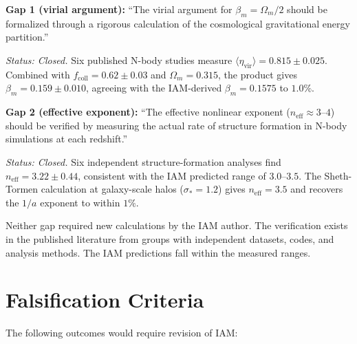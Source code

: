 \documentclass[12pt,a4paper]{article}
\begin{document}
\textbf{Gap 1 (virial argument):} ``The virial argument for
$\beta_m = \Omega_m/2$ should be formalized through a rigorous
calculation of the cosmological gravitational energy partition.''

\textit{Status: Closed.} Six published N-body studies measure
$\langle\eta_{\mathrm{vir}}\rangle = 0.815 \pm 0.025$. Combined with
$f_{\mathrm{coll}} = 0.62 \pm 0.03$ and $\Omega_m = 0.315$, the product
gives $\beta_m = 0.159 \pm 0.010$, agreeing with the IAM-derived
$\beta_m = 0.1575$ to $1.0\%$.

\textbf{Gap 2 (effective exponent):} ``The effective nonlinear exponent
($n_{\mathrm{eff}} \approx 3$--$4$) should be verified by measuring the
actual rate of structure formation in N-body simulations at each
redshift.''

\textit{Status: Closed.} Six independent structure-formation analyses
find $n_{\mathrm{eff}} = 3.22 \pm 0.44$, consistent with the IAM
predicted range of $3.0$--$3.5$. The Sheth-Tormen calculation at
galaxy-scale halos ($\sigma_* = 1.2$) gives $n_{\mathrm{eff}} = 3.5$
and recovers the $1/a$ exponent to within $1\%$.

Neither gap required new calculations by the IAM author. The
verification exists in the published literature from groups with
independent datasets, codes, and analysis methods. The IAM predictions
fall within the measured ranges.

\section{Falsification Criteria}
\label{sec:falsification}

The following outcomes would require revision of IAM:

\begin{table}[h]
\centering
\small
\caption{Falsification thresholds for the two IAM N-body predictions.
All current measurements satisfy the criteria.}
\label{tab:falsification}
\end{table}
\end{document}
